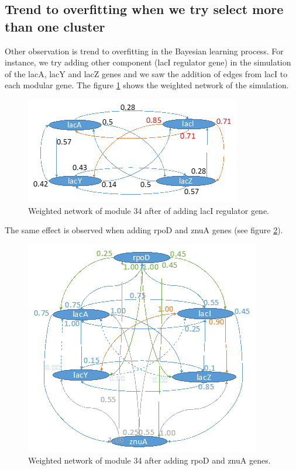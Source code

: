 \documentclass{bmcart}
\begin{document}
\subsection*{Trend to overfitting when we try select more than one cluster}

Other observation is trend to overfitting in the Bayesian learning process. For instance, we try adding other component (lacI regulator gene) in the simulation of the lacA, lacY and lacZ genes and we saw the addition of edges from lacI to each modular gene. The figure \ref{fig:wn_34-lacI} shows the weighted network of the simulation. 
\begin{figure}
\includegraphics[scale=2.5]{images/wn-34-lacI_Ecoli} \centering
\caption{Weighted network of module 34 after of adding lacI regulator gene.}
\label{fig:wn_34-lacI} 
\end{figure}
The same effect is observed when adding rpoD and znuA genes (see figure
\ref{fig:wn_34-rpoD-znuA}).
\begin{figure}
\includegraphics[scale=2.5]{images/wn-34-rpoD-znuA_Ecoli} \centering
\caption{Weighted network of module 34 after adding rpoD and znuA genes.}
\label{fig:wn_34-rpoD-znuA} 
\end{figure}
\end{document}
